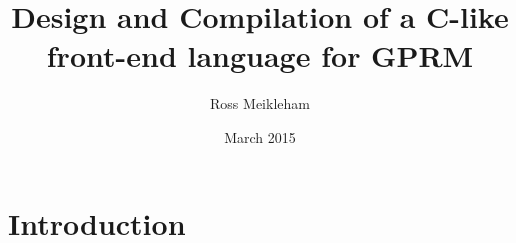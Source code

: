 \documentclass{l4proj}
\begin{document}
\title{Design and Compilation of a C-like front-end language for GPRM}
\author{Ross Meikleham}
\date{March 2015}
\maketitle

\begin{abstract}

\end{abstract}

\educationalconsent
%
%
\tableofcontents

\chapter{Introduction}



















\end{document}
